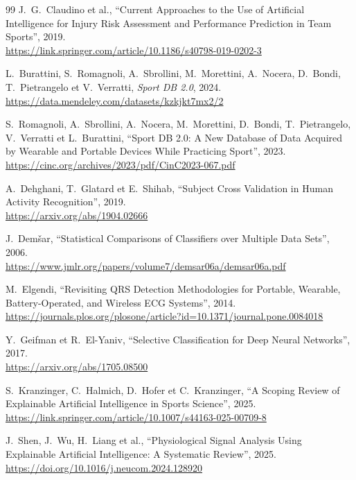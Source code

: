 \documentclass[12pt,a4paper]{article}
\begin{document}
\begin{thebibliography}{99}
J.~G.~Claudino et al.,
``Current Approaches to the Use of Artificial Intelligence for Injury Risk
Assessment and Performance Prediction in Team Sports'',
2019.\\
\url{https://link.springer.com/article/10.1186/s40798-019-0202-3}

L.~Burattini, S.~Romagnoli, A.~Sbrollini, M.~Morettini, A.~Nocera,
D.~Bondi, T.~Pietrangelo et V.~Verratti,
\emph{Sport DB 2.0},
2024.\\
\url{https://data.mendeley.com/datasets/kzkjkt7mx2/2}

S.~Romagnoli, A.~Sbrollini, A.~Nocera, M.~Morettini, D.~Bondi,
T.~Pietrangelo, V.~Verratti et L.~Burattini,
``Sport DB 2.0: A New Database of Data Acquired by Wearable and Portable
Devices While Practicing Sport'',
2023.\\
\url{https://cinc.org/archives/2023/pdf/CinC2023-067.pdf}

A.~Dehghani, T.~Glatard et E.~Shihab,
``Subject Cross Validation in Human Activity Recognition'',
2019.\\
\url{https://arxiv.org/abs/1904.02666}

J.~Demšar,
``Statistical Comparisons of Classifiers over Multiple Data Sets'',
2006.\\
\url{https://www.jmlr.org/papers/volume7/demsar06a/demsar06a.pdf}

M.~Elgendi,
``Revisiting QRS Detection Methodologies for Portable, Wearable,
Battery-Operated, and Wireless ECG Systems'',
2014.\\
\url{https://journals.plos.org/plosone/article?id=10.1371/journal.pone.0084018}

Y.~Geifman et R.~El-Yaniv,
``Selective Classification for Deep Neural Networks'',
2017.\\
\url{https://arxiv.org/abs/1705.08500}

S.~Kranzinger, C.~Halmich, D.~Hofer et C.~Kranzinger,
``A Scoping Review of Explainable Artificial Intelligence in Sports Science'',
2025.\\
\url{https://link.springer.com/article/10.1007/s44163-025-00709-8}

J.~Shen, J.~Wu, H.~Liang et al.,
``Physiological Signal Analysis Using Explainable Artificial Intelligence:
A Systematic Review'',
2025.\\
\url{https://doi.org/10.1016/j.neucom.2024.128920}


\end{thebibliography}
\end{document}
